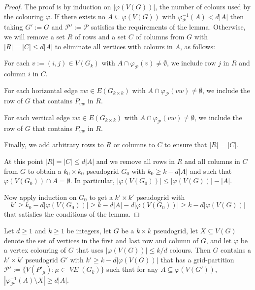 \documentclass{patmorin}
\DeclareMathOperator{\VE}{\mathit{VE}}
\begin{document}
\begin{proof}
  The proof is by induction on $|\varphi(V(G))|$, the number of colours used by the colouring $\varphi$.  If there exists no $A\subseteq \varphi(V(G))$ with $\varphi_{\mathcal{P}}^{-1}(A) < d|A|$ then taking $G':=G$ and $\mathcal{P}':=\mathcal{P}$ satisfies the requirements of the lemma. Otherwise, we will remove a set $R$ of rows and a set $C$ of columns from $G$ with $|R|=|C|\le d|A|$ to eliminate all vertices with colours in $A$, as follows:
  \begin{compactitem}
    \item For each $v:=(i,j)\in V(G_{k})$ with $A\cap\varphi_\mathcal{P}(v)\neq\emptyset$, we include row $j$ in $R$ and column $i$ in $C$.
    \item For each horizontal edge $vw\in E(G_{k\times k})$ with $A\cap\varphi_\mathcal{P}(vw)\neq\emptyset$, we include the row of $G$ that contains $P_{vw}$ in $R$.
    \item For each vertical edge $vw\in E(G_{k\times k})$ with $A\cap\varphi_\mathcal{P}(vw)\neq\emptyset$, we include the row of $G$ that contains $P_{vw}$ in $R$.
    \item Finally, we add arbitrary rows to $R$ or columns to $C$ to ensure that $|R|=|C|$.
  \end{compactitem}
  At this point $|R|=|C|\le d|A|$ and we remove all rows in $R$ and all columns in $C$ from $G$ to obtain a $k_0\times k_0$ pseudogrid $G_0$ with $k_0\ge k-d|A|$ and such that $\varphi(V(G_0))\cap A=\emptyset$.  In particular, $|\varphi(V(G_0))|\le |\varphi(V(G))|-|A|$.

  Now apply induction on $G_0$ to get a $k'\times k'$ pseudogrid with
  \[  k'\ge k_0-d|\varphi(V(G_0))|  \ge k-d|A|-d|\varphi(V(G_0))|\ge k - d|\varphi(V(G))|
  \]
  that satisfies the conditions of the lemma.
\end{proof}

\begin{lem}
  Let $d\ge 1$ and $k\ge 1$ be integers, let $G$ be a $k\times k$ pseudogrid, let $X\subseteq V(G)$ denote the set of vertices in the first and last row and column of $G$, and let $\varphi$ be a vertex colouring of $G$ that uses $|\varphi(V(G))|\le k/d$ colours.
  Then $G$ contains a $k'\times k'$ pseudogrid $G'$ with $k'\ge k - d|\varphi(V(G))|$ that has a grid-partition $\mathcal{P}':=\{V(P'_\mu):\mu\in \VE(G_{k})\}$ such that
  for any $A\subseteq \varphi(V(G'))$, $|\varphi_{\mathcal{P}'}^{-1}(A)\setminus X| \ge d|A|$.
\end{lem}
\end{document}
